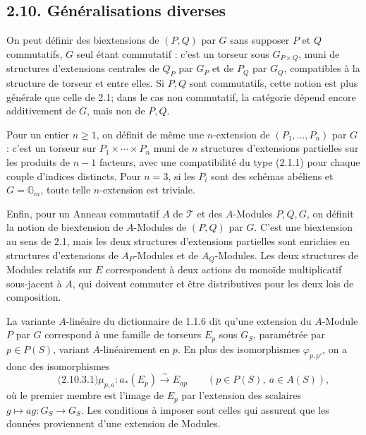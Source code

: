 \documentclass[11pt]{article}
\begin{document}
\subsection*{2.10. Généralisations diverses}
On peut définir des biextensions de \((P,Q)\) par \(G\) sans supposer \(P\) et \(Q\) commutatifs, \(G\) seul étant commutatif : c'est un torseur sous \(G_{P\times Q}\), muni de structures d'extensions centrales de \(Q_P\) par \(G_P\) et de \(P_Q\) par \(G_Q\), compatibles à la structure de torseur et entre elles.  Si \(P,Q\) sont commutatifs, cette notion est plus générale que celle de 2.1; dans le cas non commutatif, la catégorie dépend encore additivement de \(G\), mais non de \(P,Q\).

Pour un entier \(n\geq1\), on définit de même une \(n\)-extension de \((P_1,
\ldots,P_n)\) par \(G\) : c'est un torseur sur \(P_1\times\cdots\times P_n\) muni de \(n\) structures d'extensions partielles sur les produits de \(n-1\) facteurs, avec une compatibilité du type (2.1.1) pour chaque couple d'indices distincts.  Pour \(n=3\), si les \(P_i\) sont des schémas abéliens et \(G=\mathbb G_m\), toute telle \(n\)-extension est triviale.

Enfin, pour un Anneau commutatif \(A\) de \(\mathcal T\) et des \(A\)-Modules \(P,Q,G\), on définit la notion de biextension de \(A\)-Modules de \((P,Q)\) par \(G\).  C'est une biextension au sens de 2.1, mais les deux structures d'extensions partielles sont enrichies en structures d'extensions de \(A_P\)-Modules et de \(A_Q\)-Modules.  Les deux structures de Modules relatifs sur \(E\) correspondent à deux actions du monoïde multiplicatif sous-jacent à \(A\), qui doivent commuter et être distributives pour les deux lois de composition.

La variante \(A\)-linéaire du dictionnaire de 1.1.6 dit qu'une extension du \(A\)-Module \(P\) par \(G\) correspond à une famille de torseurs \(E_p\) sous \(G_S\), paramétrée par \(p\in P(S)\), variant \(A\)-linéairement en \(p\).  En plus des isomorphismes \(\varphi_{p,p'}\), on a donc des isomorphismes
\begin{equation}\qquad\text{(2.10.3.1)}
  \mu_{p,a}:a_*(E_p)\xrightarrow{\sim}E_{ap}
  \qquad(p\in P(S),\ a\in A(S)),
\end{equation}
où le premier membre est l'image de \(E_p\) par l'extension des scalaires \(g\mapsto ag:G_S\to G_S\).  Les conditions à imposer sont celles qui assurent que les données proviennent d'une extension de Modules.
\end{document}
